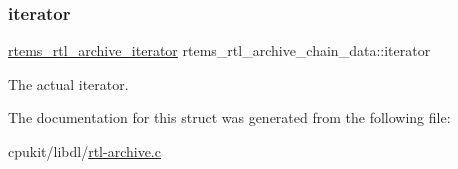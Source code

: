\subsubsection{\texorpdfstring{iterator}{iterator}}
{\footnotesize\ttfamily \mbox{\hyperlink{rtl-archive_8c_a7f654505aadef94dfaca10b5cce047e4}{rtems\+\_\+rtl\+\_\+archive\+\_\+iterator}} rtems\+\_\+rtl\+\_\+archive\+\_\+chain\+\_\+data\+::iterator}

The actual iterator. 

The documentation for this struct was generated from the following file\+:\begin{DoxyCompactItemize}
\item 
cpukit/libdl/\mbox{\hyperlink{rtl-archive_8c}{rtl-\/archive.\+c}}\end{DoxyCompactItemize}
